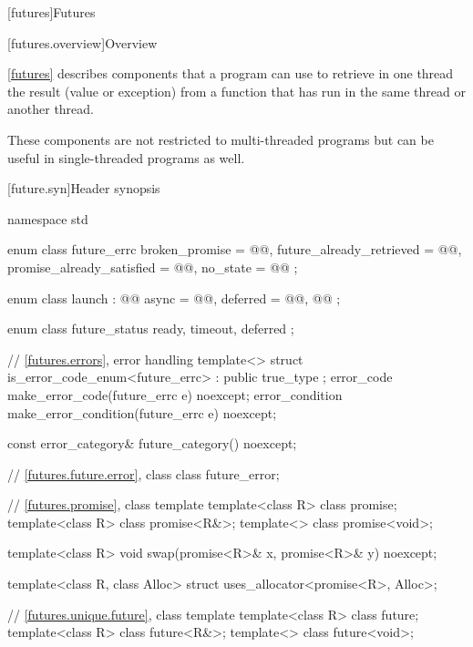 [futures]{Futures}

[futures.overview]{Overview}

\pnum
\ref{futures} describes components that a \Cpp{} program can use to retrieve in one thread the
result (value or exception) from a function that has run in the same thread or another thread.
\begin{note}
These components are not restricted to multi-threaded programs but can be useful in
single-threaded programs as well.
\end{note}

[future.syn]{Header  synopsis}

%
%
\begin{codeblock}
namespace std {
  enum class future_errc {
    broken_promise = @@,
    future_already_retrieved = @@,
    promise_already_satisfied = @@,
    no_state = @@
  };

  enum class launch : @\unspec{}@ {
    async = @\unspec{}@,
    deferred = @\unspec{}@,
    @@
  };

  enum class future_status {
    ready,
    timeout,
    deferred
  };

  // \ref{futures.errors}, error handling
  template<> struct is_error_code_enum<future_errc> : public true_type { };
  error_code make_error_code(future_errc e) noexcept;
  error_condition make_error_condition(future_errc e) noexcept;

  const error_category& future_category() noexcept;

  // \ref{futures.future.error}, class 
  class future_error;

  // \ref{futures.promise}, class template 
  template<class R> class promise;
  template<class R> class promise<R&>;
  template<> class promise<void>;

  template<class R>
    void swap(promise<R>& x, promise<R>& y) noexcept;

  template<class R, class Alloc>
    struct uses_allocator<promise<R>, Alloc>;

  // \ref{futures.unique.future}, class template 
  template<class R> class future;
  template<class R> class future<R&>;
  template<> class future<void>;

}
\end{codeblock}
